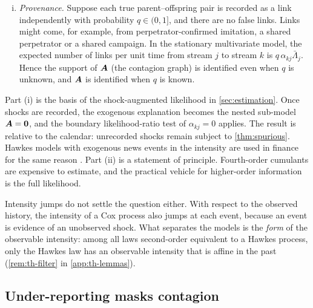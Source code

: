 \begin{corollary}
\begin{enumerate}[(i)]
  Then $\Pr_H\neq\Pr_C$. Counts over long windows already reveal this. The limits
  $\chi_j=\lim_{T\to\infty}T^{-1}\operatorname{cum}_j N(0,T]$ are
  $\mu\E\mathcal S^j$ ($\mathcal S\sim$ Borel$(n)$) for $H$ and $\nu+r\E[\Pois(m)^j]$ for $C$.
  Matching $\chi_1,\chi_2,\chi_3$ determines $(\nu,r,m)$
  uniquely, with $\gamma$ free. With $\gamma=\beta(1-n)$, this choice is a member of
  the family of \cref{thm:equiv}. For every such $C$,
  \[
  \chi_4^{H}-\chi_4^{C}=\frac{\mu\,n^3\,Q(1-n)}{(1-n)^7(2-n)}>0,\qquad
  Q(u)=2u^4+8u^3+15u^2+16u+6 ,
  \]
  so no shot-noise Cox process matches the first four cumulant rates of $H$.
  \item \emph{Provenance.} Suppose each true parent--offspring pair is recorded as a
  link independently with probability $q\in(0,1]$, and there are no false links. Links
  might come, for example, from perpetrator-confirmed imitation, a shared perpetrator
  or a shared campaign. In the stationary multivariate model, the expected number of
  links per unit time from stream $j$ to stream $k$ is
  $q\,\alpha_{kj}\bar\Lambda_j$. Hence the support of $\bm{A}$ (the contagion graph) is
  identified even when $q$ is unknown, and $\bm{A}$ is identified when $q$ is known.
\end{enumerate}
\end{corollary}

Part (i) is the basis of the shock-augmented likelihood in \cref{sec:estimation}. Once
shocks are recorded, the exogenous explanation becomes the nested sub-model
$\bm{A}=\mathbf{0}$, and the boundary likelihood-ratio test of $\alpha_{kj}=0$ applies. The
result is relative to the calendar: unrecorded shocks remain subject to
\cref{thm:spurious}. Hawkes models with exogenous news events in the intensity are
used in finance for the same reason \citep{rambaldi2015}. Part (ii) is a
statement of principle. Fourth-order cumulants are expensive to estimate, and the
practical vehicle for higher-order information is the full likelihood.

Intensity jumps do not settle the question either. With respect to the observed history,
the intensity of a Cox process also jumps at each event, because an event is evidence of
an unobserved shock. What separates the models is the \emph{form} of the observable
intensity: among all laws second-order equivalent to a Hawkes process, only the Hawkes
law has an observable intensity that is affine in the past (\cref{rem:th-filter} in
\cref{app:th-lemmas}).

\subsection{Under-reporting masks contagion}\label{sec:th-thinning}

